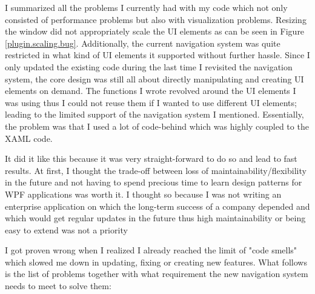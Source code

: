 I summarized all the problems I currently had with my code which not only consisted of performance problems but also with visualization problems. Resizing the window did not appropriately scale the UI elements as can be seen in Figure \ref{plugin.scaling.bug}. Additionally, the current navigation system was quite restricted in what kind of UI elements it supported without further hassle. Since I only updated the existing code during the last time I revisited the navigation system, the core design was still all about directly manipulating and creating UI elements on demand. The functions I wrote revolved around the UI elements I was using thus I could not reuse them if I wanted to use different UI elements; leading to the limited support of the navigation system I mentioned. Essentially, the problem was that I used a lot of code-behind which was highly coupled to the XAML code.

\par

It did it like this because it was very straight-forward to do so and lead to fast results. At first, I thought the trade-off between loss of maintainability/flexibility in the future and not having to spend precious time to learn design patterns for WPF applications was worth it. I thought so because I was not writing an enterprise application on which the long-term success of a company depended and which would get regular updates in the future thus high maintainability or being easy to extend was not a priority

\par

I got proven wrong when I realized I already reached the limit of "code smells" which slowed me down in updating, fixing or creating new features. What follows is the list of problems together with what requirement the new navigation system needs to meet to solve them:

